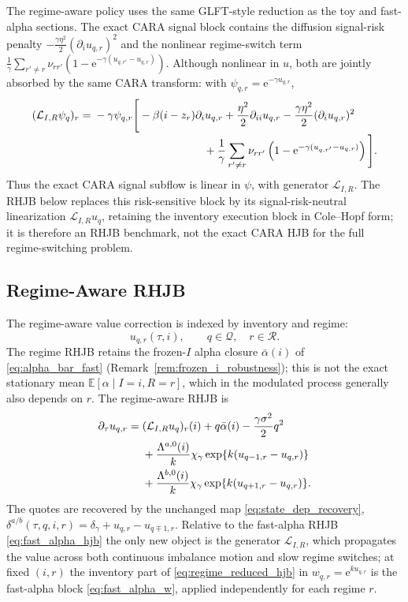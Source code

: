 \documentclass[11pt,a4paper]{article}
\newcommand{\E}{\mathbb{E}}
\newcommand{\Qcal}{\mathcal{Q}}
\newcommand{\e}{\mathrm e}
\newcommand{\alphabar}{\bar\alpha}
\theoremstyle{plain}
\theoremstyle{definition}
\begin{document}
The regime-aware policy uses the same GLFT-style reduction as the toy and
fast-alpha sections.  The exact CARA signal block contains the diffusion
signal-risk penalty \(-\tfrac{\gamma\eta^2}{2}(\partial_i u_{q,r})^2\) and the
nonlinear regime-switch term
\(\frac1\gamma\sum_{r'\ne r}\nu_{rr'}(1-\e^{-\gamma(u_{q,r'}-u_{q,r})})\).
Although nonlinear in \(u\), both are jointly absorbed by the same CARA
transform: with \(\psi_{q,r}=\e^{-\gamma u_{q,r}}\),
\begin{align}
(\mathcal L_{I,R}\psi_q)_r={}&-\gamma \psi_{q,r}\Bigg[
-\beta(i-z_r)\partial_i u_{q,r}+\frac{\eta^2}{2}\partial_{ii}u_{q,r}
-\frac{\gamma\eta^2}{2}(\partial_i u_{q,r})^2\notag\\[-2pt]
&\hspace{35mm}+\frac1\gamma\sum_{r'\ne r}\nu_{rr'}
\left(1-\e^{-\gamma(u_{q,r'}-u_{q,r})}\right)\Bigg].
\label{eq:regime_cara_joint_cole_hopf}
\end{align}
Thus the exact CARA signal subflow is linear in \(\psi\), with generator
\(\mathcal L_{I,R}\).  The RHJB below replaces this risk-sensitive block by
its signal-risk-neutral linearization \(\mathcal L_{I,R}u_q\), retaining the
inventory execution block in Cole--Hopf form; it is therefore an RHJB
benchmark, not the exact CARA HJB for the full regime-switching problem.

\subsection{Regime-Aware RHJB}

The regime-aware value correction is indexed by inventory and regime:
\[
u_{q,r}(\tau,i),
\qquad q\in\Qcal,\quad r\in\mathcal R.
\]
The regime RHJB retains the frozen-\(I\) alpha closure \(\alphabar(i)\) of
\eqref{eq:alpha_bar_fast} (Remark~\ref{rem:frozen_i_robustness}); this is not
the exact stationary mean \(\E[\alpha\mid I=i,R=r]\), which in the modulated
process generally also depends on \(r\).
The regime-aware RHJB is
\begin{align}
\partial_\tau u_{q,r}
={}&
(\mathcal{L}_{I,R} u_q)_r(i)
+q\alphabar(i)
-\frac{\gamma\sigma^2}{2}q^2
\notag\\
&+
\frac{\Lambda^{a,0}(i)}{k}
\chi_\gamma
\exp\{k(u_{q-1,r}-u_{q,r})\}
\notag\\
&+
\frac{\Lambda^{b,0}(i)}{k}
\chi_\gamma
\exp\{k(u_{q+1,r}-u_{q,r})\}.
\label{eq:regime_reduced_hjb}
\end{align}
The quotes are recovered by the unchanged map \eqref{eq:state_dep_recovery},
\(\delta^{a/b}(\tau,q,i,r)=\delta_\gamma+u_{q,r}-u_{q\mp1,r}\).  Relative to
the fast-alpha RHJB \eqref{eq:fast_alpha_hjb} the only new object is the generator \(\mathcal{L}_{I,R}\),
which propagates the value across both continuous imbalance motion and slow
regime switches; at fixed \((i,r)\) the inventory part of
\eqref{eq:regime_reduced_hjb} in \(w_{q,r}=\e^{ku_{q,r}}\) is the fast-alpha
block \eqref{eq:fast_alpha_w}, applied independently for each regime \(r\).
\end{document}
